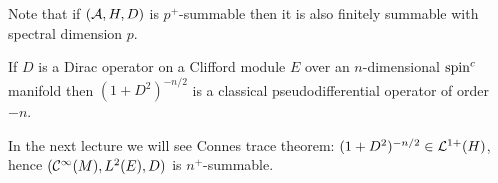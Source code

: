 \noindent Note that if $(\mathcal{A},H,D)$ is $p^+$-summable then it is also finitely summable with spectral dimension $p$.

\begin{example}
 If $D$ is a Dirac operator on a Clifford module $E$ over an $n$-dimensional $\mathrm{spin}^c$ manifold then $(1+D^2)^{-n/2}$ is a classical pseudodifferential operator of order $-n$.
\end{example}

\noindent In the next lecture we will see Connes trace theorem: $(1+D^2)^{-n/2}\in\mathcal{L}^{1+}(H)$, hence $(\mathcal{C}^\infty(M),L^2(E),D)$ is $n^+$-summable.










